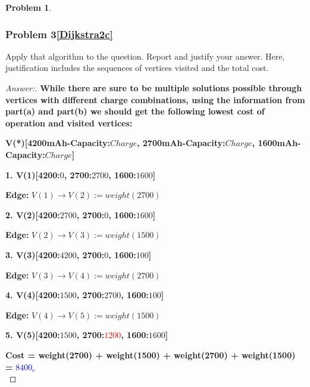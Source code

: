 \documentclass[11pt]{article}
\theoremstyle{definition}
\theoremstyle{definition}
\newtheorem{required}{Problem}
\theoremstyle{definition}
\begin{document}
\begin{required}
\begin{enumerate}[label=(\alph*)]
\newpage
\subsubsection{Problem 3\ref{Dijkstra2c}}
\item \label{Dijkstra2c} Apply that algorithm to the question. Report and justify your answer. Here, justification includes the sequences of vertices visited and the total cost. 

\begin{proof}[Answer:]
\item \textbf{While there are sure to be multiple solutions possible through vertices with different charge combinations, using the information from part(a) and part(b) we should get the following lowest cost of operation and visited vertices:} \\

\item \textbf{V(*)[4200mAh-Capacity:$Charge$, 2700mAh-Capacity:$Charge$, 1600mAh-Capacity:$Charge$]} \\
\item \textbf{1. V(1)[4200:$0$, 2700:$2700$, 1600:$1600$]} \\
\item	\hspace*{10mm} \textbf{Edge:} $V(1) \to V(2) := weight(2700)$ \\
\item \textbf{2. V(2)[4200:$2700$, 2700:$0$, 1600:$1600$]} \\
\item	\hspace*{10mm} \textbf{Edge:} $V(2) \to V(3) := weight(1500)$ \\
\item \textbf{3. V(3)[4200:$4200$, 2700:$0$, 1600:$100$]}\\
\item	\hspace*{10mm} \textbf{Edge:} $V(3) \to V(4) := weight(2700)$ \\
\item \textbf{4. V(4)[4200:$1500$, 2700:$2700$, 1600:$100$]} \\
\item	\hspace*{10mm} \textbf{Edge:} $V(4) \to V(5) := weight(1500)$ \\
\item \textbf{5. V(5)[4200:$1500$, 2700:\textcolor{red}{$1200$}, 1600:$1600$]} \\
\item	\textbf{Cost = weight(2700) + weight(1500) + weight(2700) + weight(1500) =} \textcolor{blue}{$8400_c$} \\
\end{proof}

\end{enumerate}
\end{required}
\end{document}
